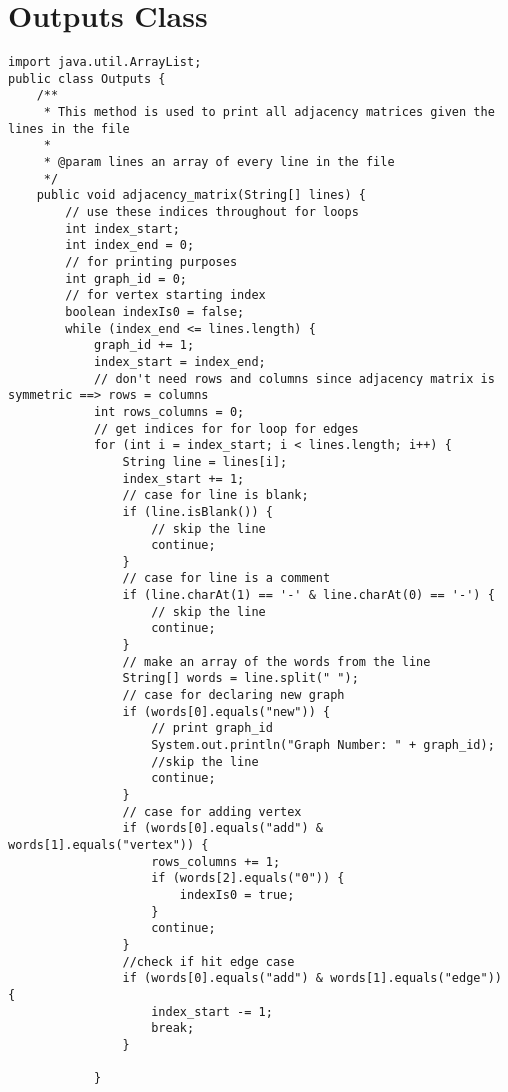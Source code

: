 \documentclass{article}
\begin{document}
\newpage
    
\section{Outputs Class}
    \begin{lstlisting}
import java.util.ArrayList;
public class Outputs {
    /**
     * This method is used to print all adjacency matrices given the lines in the file
     *
     * @param lines an array of every line in the file
     */
    public void adjacency_matrix(String[] lines) {
        // use these indices throughout for loops
        int index_start;
        int index_end = 0;
        // for printing purposes
        int graph_id = 0;
        // for vertex starting index
        boolean indexIs0 = false;
        while (index_end <= lines.length) {
            graph_id += 1;
            index_start = index_end;
            // don't need rows and columns since adjacency matrix is symmetric ==> rows = columns
            int rows_columns = 0;
            // get indices for for loop for edges
            for (int i = index_start; i < lines.length; i++) {
                String line = lines[i];
                index_start += 1;
                // case for line is blank;
                if (line.isBlank()) {
                    // skip the line
                    continue;
                }
                // case for line is a comment
                if (line.charAt(1) == '-' & line.charAt(0) == '-') {
                    // skip the line
                    continue;
                }
                // make an array of the words from the line
                String[] words = line.split(" ");
                // case for declaring new graph
                if (words[0].equals("new")) {
                    // print graph_id
                    System.out.println("Graph Number: " + graph_id);
                    //skip the line
                    continue;
                }
                // case for adding vertex
                if (words[0].equals("add") & words[1].equals("vertex")) {
                    rows_columns += 1;
                    if (words[2].equals("0")) {
                        indexIs0 = true;
                    }
                    continue;
                }
                //check if hit edge case
                if (words[0].equals("add") & words[1].equals("edge")) {
                    index_start -= 1;
                    break;
                }

            }


\end{lstlisting}
\end{document}
